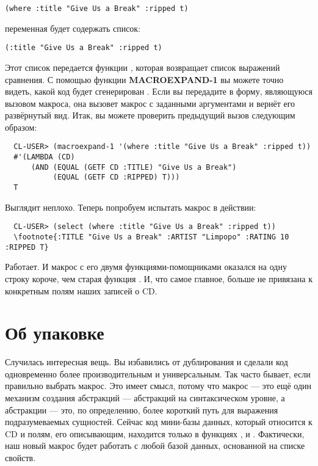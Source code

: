 \begin{lstlisting}
(where :title "Give Us a Break" :ripped t)
\end{lstlisting}

переменная  будет содержать список:

\begin{lstlisting}
(:title "Give Us a Break" :ripped t)
\end{lstlisting}

Этот список передается функции , которая возвращает список
выражений сравнения. С помощью функции \textbf{MACROEXPAND-1} вы можете точно видеть,
какой код будет сгенерирован . Если вы передадите в 
форму, являющуюся вызовом макроса, она вызовет макрос с заданными аргументами и вернёт его
развёрнутый вид. Итак, вы можете проверить предыдущий вызов  следующим
образом:

\begin{verbatim}
  CL-USER> (macroexpand-1 '(where :title "Give Us a Break" :ripped t))
  #'(LAMBDA (CD)
      (AND (EQUAL (GETF CD :TITLE) "Give Us a Break")
           (EQUAL (GETF CD :RIPPED) T)))
  T
\end{verbatim}

Выглядит неплохо. Теперь попробуем испытать макрос в действии:

\begin{verbatim}
  CL-USER> (select (where :title "Give Us a Break" :ripped t))
  \footnote{:TITLE "Give Us a Break" :ARTIST "Limpopo" :RATING 10 :RIPPED T}
\end{verbatim}

Работает. И макрос  с его двумя функциями-помощниками оказался на одну строку
короче, чем старая функция . И, что самое главное,  больше не
привязана к конкретным полям наших записей о CD.

\section{Об упаковке}

Случилась интересная вещь. Вы избавились от дублирования и сделали код одновременно более
производительным и универсальным. Так часто бывает, если правильно выбрать макрос. Это
имеет смысл, потому что макрос --- это ещё один механизм создания абстракций ---
абстракций на синтаксическом уровне, а абстракции --- это, по определению, более короткий
путь для выражения подразумеваемых сущностей. Сейчас код мини-базы данных, который
относится к CD и полям, его описывающим, находится только в функциях ,
 и . Фактически, наш новый макрос будет работать с любой
базой данных, основанной на списке свойств.

